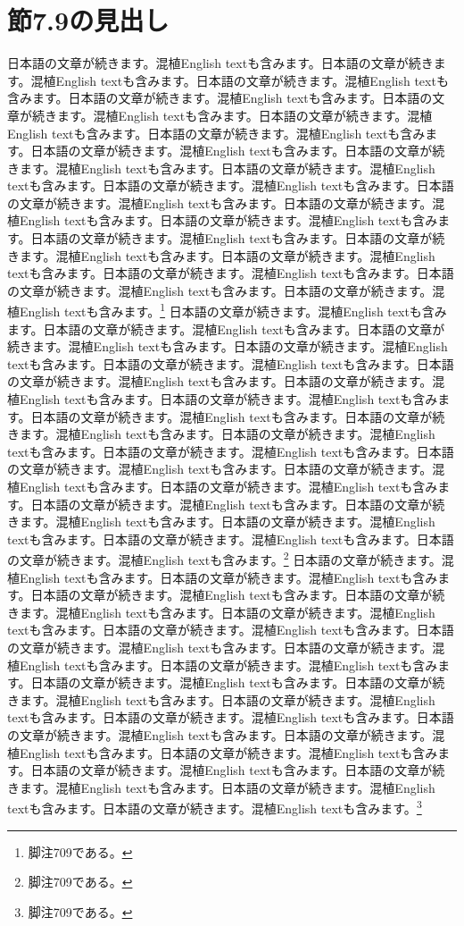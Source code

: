 \documentclass[pdflatex,book]{jlreq}
\begin{document}
\section{節7.9の見出し}
日本語の文章が続きます。混植English textも含みます。日本語の文章が続きます。混植English textも含みます。日本語の文章が続きます。混植English textも含みます。日本語の文章が続きます。混植English textも含みます。日本語の文章が続きます。混植English textも含みます。日本語の文章が続きます。混植English textも含みます。日本語の文章が続きます。混植English textも含みます。日本語の文章が続きます。混植English textも含みます。日本語の文章が続きます。混植English textも含みます。日本語の文章が続きます。混植English textも含みます。日本語の文章が続きます。混植English textも含みます。日本語の文章が続きます。混植English textも含みます。日本語の文章が続きます。混植English textも含みます。日本語の文章が続きます。混植English textも含みます。日本語の文章が続きます。混植English textも含みます。日本語の文章が続きます。混植English textも含みます。日本語の文章が続きます。混植English textも含みます。日本語の文章が続きます。混植English textも含みます。日本語の文章が続きます。混植English textも含みます。日本語の文章が続きます。混植English textも含みます。\footnote{脚注709である。}
日本語の文章が続きます。混植English textも含みます。日本語の文章が続きます。混植English textも含みます。日本語の文章が続きます。混植English textも含みます。日本語の文章が続きます。混植English textも含みます。日本語の文章が続きます。混植English textも含みます。日本語の文章が続きます。混植English textも含みます。日本語の文章が続きます。混植English textも含みます。日本語の文章が続きます。混植English textも含みます。日本語の文章が続きます。混植English textも含みます。日本語の文章が続きます。混植English textも含みます。日本語の文章が続きます。混植English textも含みます。日本語の文章が続きます。混植English textも含みます。日本語の文章が続きます。混植English textも含みます。日本語の文章が続きます。混植English textも含みます。日本語の文章が続きます。混植English textも含みます。日本語の文章が続きます。混植English textも含みます。日本語の文章が続きます。混植English textも含みます。日本語の文章が続きます。混植English textも含みます。日本語の文章が続きます。混植English textも含みます。日本語の文章が続きます。混植English textも含みます。\footnote{脚注709である。}
日本語の文章が続きます。混植English textも含みます。日本語の文章が続きます。混植English textも含みます。日本語の文章が続きます。混植English textも含みます。日本語の文章が続きます。混植English textも含みます。日本語の文章が続きます。混植English textも含みます。日本語の文章が続きます。混植English textも含みます。日本語の文章が続きます。混植English textも含みます。日本語の文章が続きます。混植English textも含みます。日本語の文章が続きます。混植English textも含みます。日本語の文章が続きます。混植English textも含みます。日本語の文章が続きます。混植English textも含みます。日本語の文章が続きます。混植English textも含みます。日本語の文章が続きます。混植English textも含みます。日本語の文章が続きます。混植English textも含みます。日本語の文章が続きます。混植English textも含みます。日本語の文章が続きます。混植English textも含みます。日本語の文章が続きます。混植English textも含みます。日本語の文章が続きます。混植English textも含みます。日本語の文章が続きます。混植English textも含みます。日本語の文章が続きます。混植English textも含みます。\footnote{脚注709である。}
\end{document}
